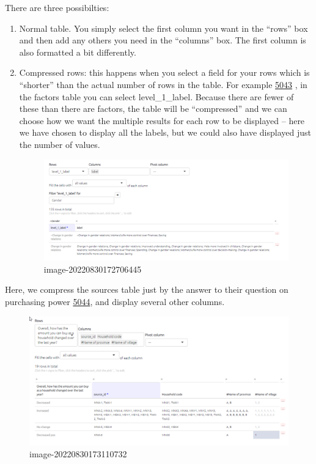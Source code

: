 \documentclass[
]{book}
\begin{document}
There are three possibilties:

\begin{enumerate}
\def\labelenumi{\arabic{enumi})}
\item
  Normal table. You simply select the first column you want in the ``rows'' box and then add any others you need in the ``columns'' box. The first column is also formatted a bit differently.
\item
  Compressed rows: this happens when you select a field for your rows which is ``shorter'' than the actual number of rows in the table. For example \href{https://causalmap.shinyapps.io/tokyo/?s=5043}{5043} , in the factors table you can select level\_1\_label. Because there are fewer of these than there are factors, the table will be ``compressed'' and we can choose how we want the multiple results for each row to be displayed -- here we have chosen to display all the labels, but we could also have displayed just the number of values.

  \begin{figure}
  \centering
  \includegraphics{_assets/image-20220830172706445.png}
  \caption{image-20220830172706445}
  \end{figure}
\end{enumerate}

Here, we compress the sources table just by the answer to their question on purchasing power \href{https://causalmap.shinyapps.io/tokyo/?s=5044}{5044}, and display several other columns.

\begin{figure}
\centering
\includegraphics{_assets/image-20220830173110732.png}
\caption{image-20220830173110732}
\end{figure}
\end{document}
